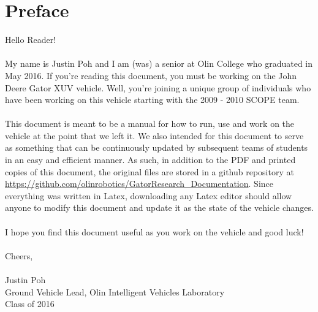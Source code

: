 \chapter{Preface}

Hello Reader! \\ \\
%
\noindent My name is Justin Poh and I am (was) a senior at Olin College who graduated in May 2016. If you're reading this document, you must be working on the John Deere Gator XUV vehicle. Well, you're joining a unique group of individuals who have been working on this vehicle starting with the 2009 - 2010 SCOPE team. \\ \\
%
This document is meant to be a manual for how to run, use and work on the vehicle at the point that we left it. We also intended for this document to serve as something that can be continuously updated by subsequent teams of students in an easy and efficient manner. As such, in addition to the PDF and printed copies of this document, the original files are stored in a github repository at \url{https://github.com/olinrobotics/GatorResearch_Documentation}. Since everything was written in Latex, downloading any Latex editor should allow anyone to modify this document and update it as the state of the vehicle changes.\\ \\
%
I hope you find this document useful as you work on the vehicle and good luck! \\ \\
%
Cheers,\\ \\
%
Justin Poh\\
Ground Vehicle Lead, Olin Intelligent Vehicles Laboratory\\
Class of 2016